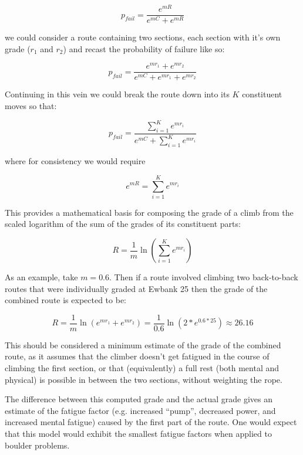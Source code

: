 \documentclass[11pt]{article}
\begin{document}
\begin{equation}
p_{fail} = \frac{e^{mR}}{e^{mC} + e^{mR}}
\end{equation} 

we could consider a route containing two sections, each section with it's own grade ($r_1$ and $r_2$) and recast the probability of failure like so:

\begin{equation}
p_{fail} = \frac{e^{mr_1} + e^{mr_2}}{e^{mC} + e^{mr_1} + e^{mr_2}}
\end{equation} 

Continuing in this vein we could break the route down into its $K$ constituent moves so that:

\begin{equation}
p_{fail} = \frac{\sum_{i=1}^{K}e^{mr_i}}{e^{mC} + \sum_{i=1}^{K}e^{mr_i}}
\label{compose}
\end{equation} 

where for consistency we would require

\begin{equation}
e^{mR} = \sum_{i=1}^{K}e^{mr_i}
\end{equation} 

This provides a mathematical basis for composing the grade of a climb from the scaled logarithm of the sum of the grades of its constituent parts:

\begin{equation}
R = \frac{1}{m} \ln \left(\sum_{i=1}^{K}e^{mr_i}\right)
\end{equation} 

As an example, take $m=0.6$. Then if a route involved climbing two back-to-back routes that were individually graded at Ewbank 25 then the grade of the combined route is expected to be:

\begin{equation}
R = \frac{1}{m} \ln \left(e^{mr_1} + e^{mr_2}\right) = \frac{1}{0.6} \ln \left(2 * e^{0.6 * 25}\right) \approx 26.16
\end{equation} 

This should be considered a minimum estimate of the grade of the combined route, as it assumes that the climber doesn't get fatigued in the course of climbing the first section, or that (equivalently) a full rest (both mental and physical) is possible in between the two sections, without weighting the rope.

The difference between this computed grade and the actual grade gives an estimate of the fatigue factor (e.g. increased ``pump'', decreased power, and increased mental fatigue) caused by the first part of the route. One would expect that this model would exhibit the smallest fatigue factors when applied to boulder problems. 
\end{document}
